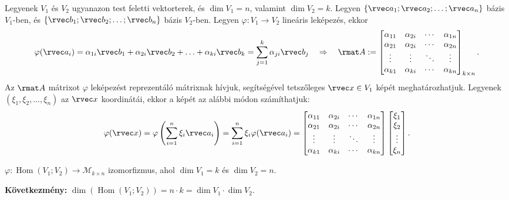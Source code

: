 \begin{blueBox}

  Legyenek $V_1$ és $V_2$ ugyanazon test feletti vektorterek, és $\dim V_1 = n$,
  valamint $\dim V_2 = k$. Legyen $\{ \rvec a_1; \rvec a_2; \ldots; \rvec a_n \}$
  bázis $V_1$-ben, és $\{ \rvec b_1; \rvec b_2; \ldots; \rvec b_n \}$ bázis
  $V_2$-ben. Legyen $\varphi: V_1 \rightarrow V_2$ lineáris leképezés, ekkor
  $$
    \varphi(\rvec a_i)
    = \alpha_{1i} \rvec b_1
    + \alpha_{2i} \rvec b_2
    + \ldots
    + \alpha_{ki} \rvec b_k
    = \sum_{j=1}^{k} \alpha_{ji} \rvec b_j
    \quad\Rightarrow\quad
    \rmat A := \begin{bmatrix}
      \alpha_{11} & \alpha_{2i} & \cdots & \alpha_{1n} \\
      \alpha_{21} & \alpha_{2i} & \cdots & \alpha_{2n} \\
      \vdots      & \vdots      & \ddots & \vdots      \\
      \alpha_{k1} & \alpha_{ki} & \cdots & \alpha_{kn}
    \end{bmatrix}_{k \times n}
    \text.
  $$
  Az $\rmat A$ mátrixot $\varphi$ leképezést reprezentáló mátrixnak hívjuk,
  segítségével tetszőleges $\rvec x \in V_1$ képét meghatározhatjuk. Legyenek
  $(\xi_1, \xi_2, \ldots, \xi_n)$ az $\rvec x$ koordinátái, ekkor a képét az
  alábbi módon számíthatjuk:
  $$
    \varphi(\rvec x)
    = \varphi\left( \sum_{i=1}^{n} \xi_i \rvec a_i \right)
    = \sum_{i=1}^{n} \xi_i \varphi(\rvec a_i)
    = \begin{bmatrix}
      \alpha_{11} & \alpha_{2i} & \cdots & \alpha_{1n} \\
      \alpha_{21} & \alpha_{2i} & \cdots & \alpha_{2n} \\
      \vdots      & \vdots      & \ddots & \vdots      \\
      \alpha_{k1} & \alpha_{ki} & \cdots & \alpha_{kn}
    \end{bmatrix} \begin{bmatrix}
      \xi_1  \\
      \xi_2  \\
      \vdots \\
      \xi_n
    \end{bmatrix}
    \text.
  $$
\end{blueBox}

\begin{statement}
  $\varphi: \operatorname{Hom} (V_1; V_2) \rightarrow \mathcal M_{k \times n}$
  izomorfizmus, ahol $\dim V_1 = k$ és $\dim V_2 = n$.

  {\sffamily\bfseries Következmény:}
  $\dim(\operatorname{Hom} (V_1; V_2)) = n \cdot k = \dim V_1 \cdot \dim V_2$.
\end{statement}

